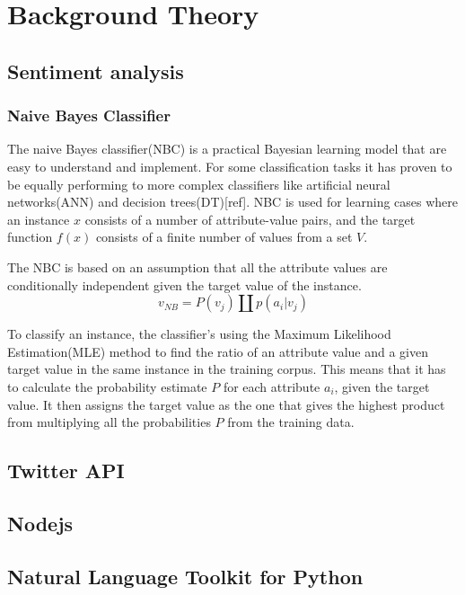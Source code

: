 \section{Background Theory}
	\subsection{Sentiment analysis}
		\subsubsection{Naive Bayes Classifier}
		The naive Bayes classifier(NBC) is a practical Bayesian learning model that are easy to understand and implement. For some classification tasks it has proven to be equally performing to more complex classifiers like artificial neural networks(ANN) and decision trees(DT)[ref]. NBC is used for learning cases where an instance $x$ consists of a number of attribute-value pairs, and the target function $f(x)$ consists of a finite number of values from a set $V$.

The NBC is based on an assumption that all the attribute values are conditionally independent given the target value of the instance.
\begin{equation}
\label{equation:nbc}
v_{NB} = P(v_j) \amalg p(a_i|v_j)
\end{equation}

To classify an instance, the classifier's using the Maximum Likelihood Estimation(MLE) method to find the ratio of an attribute value and a given target value in the same instance in the training corpus. This means that it has to calculate the probability estimate $P$ for each attribute $a_i$, given the target value. It then assigns the target value as the one that gives the highest product from multiplying all the probabilities $P$ from the training data.
	\subsection{Twitter API}
	\subsection{Nodejs}
	\subsection{Natural Language Toolkit for Python}